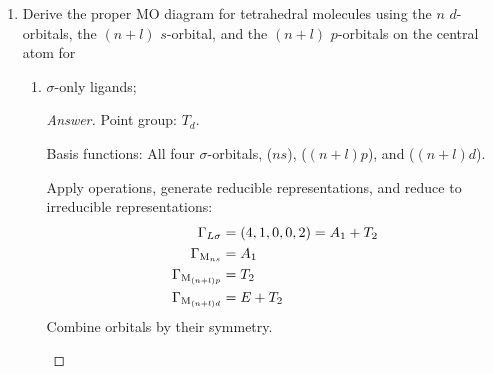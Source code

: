 \documentclass[../psets.tex]{subfiles}
\begin{document}
\begin{enumerate}[label={\Roman*)}]
    \item {}Derive the proper MO diagram for tetrahedral molecules  using the $n$ $d$-orbitals, the $(n+l)$ $s$-orbital, and the $(n+l)$ $p$-orbitals on the central atom  for
    \begin{enumerate}
        \item $\sigma$-only ligands;
        \begin{proof}[Answer]
            Point group: $T_d$.\par
            Basis functions: All four  $\sigma$-orbitals, ($ns$), ($(n+l)p$), and ($(n+l)d$).\par
            Apply operations, generate reducible representations, and reduce to irreducible representations:
            \begin{align*}
                \Gamma_{L\sigma} &= (4,1,0,0,2) = A_1+T_2\\
                \Gamma_{\ce{M}_{ns}} &= A_1\\
                \Gamma_{\ce{M}_{(n+l)p}} &= T_2\\
                \Gamma_{\ce{M}_{(n+l)d}} &= E+T_2
            \end{align*}
            Combine orbitals by their symmetry.
            \begin{center}
\end{center}
\end{proof}
\end{enumerate}
\end{enumerate}
\end{document}
